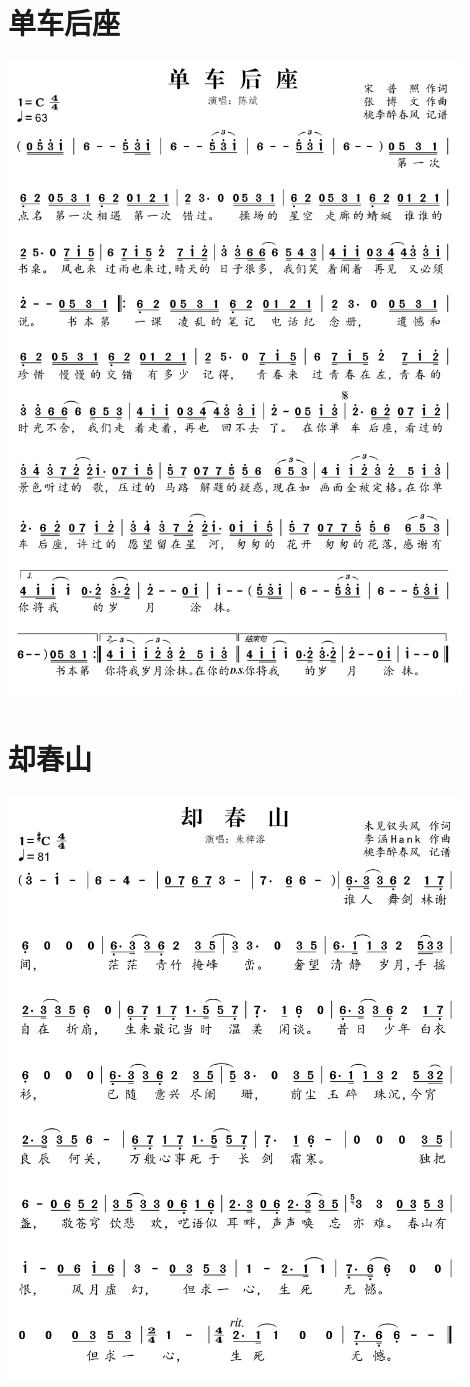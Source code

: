 \documentclass[cn,pad,twocol]{elegantbook}
\begin{document}
\section{单车后座} \includegraphics[width=0.9\textwidth]{rpi400/20210212单车后座.png}
\section{却春山} \includegraphics[width=0.9\textwidth]{rpi400/20210212却春山.png}
\end{document}
